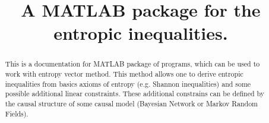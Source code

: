 \documentclass{elsart}
\begin{document}
\begin{frontmatter}
\title{A MATLAB package for the entropic inequalities.}

\author{}

\address{Naturwissenschaftlich-Technische Fakult\"at, Universit\"at Siegen, Walter-Flex-Str. 3, 57068 Siegen, Germany}



\begin{abstract}
This is a documentation for MATLAB package of programs, which can be used to work with entropy vector method. This method allows one to derive entropic inequalities from basics axioms of entropy (e.g. Shannon inequalities) and some possible additional linear constraints. These additional constrains can be defined by the causal structure of some causal model (Bayesian Network or Markov Random Fields).  
\end{abstract}


\end{frontmatter}
\end{document}
